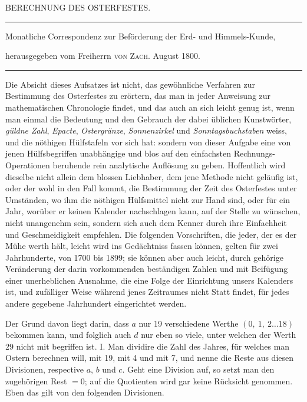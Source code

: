 \clearpage
{}
%
\begin{center}
{\large BERECHNUNG DES OSTERFESTES.\par}
\medskip\hrule\medskip
{\small Monatliche Correspondenz zur Beförderung der Erd- und Himmels-Kunde,\par
herausgegeben vom Freiherrn \textsc{von Zach}. August 1800.\par}
\medskip\hrule
\end{center}
\medskip
Die Absicht dieses Aufsatzes ist nicht, das gewöhnliche Verfahren zur Bestimmung
des Osterfestes zu erörtern, das man in jeder Anweisung zur mathematischen
Chronologie findet, und das auch an sich leicht genug ist, wenn man
einmal die Bedeutung und den Gebrauch der dabei üblichen Kunstwörter, \textit{güldne
Zahl}, \textit{Epacte}, \textit{Ostergränze}, \textit{Sonnenzirkel} und \textit{Sonntagsbuchstaben} weiss, und die
nöthigen Hülfstafeln vor sich hat: sondern von dieser Aufgabe eine von jenen
Hülfsbegriffen unabhängige und blos auf den einfachsten Rechnungs-Operationen
beruhende rein analytische Auflösung zu geben. Hoffentlich wird dieselbe
nicht allein dem blossen Liebhaber, dem jene Methode nicht geläufig ist, oder
der wohl in den Fall kommt, die Bestimmung der Zeit des Osterfestes unter Umständen,
wo ihm die nöthigen Hülfsmittel nicht zur Hand sind, oder für ein Jahr,
worüber er keinen Kalender nachschlagen kann, auf der Stelle zu wünschen,
nicht unangenehm sein, sondern sich auch dem Kenner durch ihre Einfachheit
und Geschmeidigkeit empfehlen. Die folgenden Vorschriften, die jeder, der es
der Mühe werth hält, leicht wird ins Gedächtniss fassen können, gelten für zwei
Jahrhunderte, von 1700 bis 1899; sie können aber auch leicht, durch gehörige
Veränderung der darin vorkommenden beständigen Zahlen und mit Beifügung
einer unerheblichen Ausnahme, die eine Folge der Einrichtung unsers Kalenders
ist, und zufälliger Weise während jenes Zeitraumes nicht Statt findet, für jedes
andere gegebene Jahrhundert eingerichtet werden.

%
\expandafter\def\csname HistoricalNoteText2\endcsname{Der Grund davon liegt darin, dass $a$ nur 19 verschiedene Werthe $(0,\ 1,\ 2\ldots18)$ bekommen
kann, und folglich auch $d$ nur eben so viele, unter welchen der Werth 29 nicht mit begriffen ist.}
I. Man dividire die Zahl des Jahres, für welches man Ostern berechnen
will, mit 19, mit 4 und mit 7, und nenne die Reste aus diesen Divisionen, respective
$a$, $b$ und $c$. Geht eine Division auf, so setzt man den zugehörigen Rest
$=0$; auf die Quotienten wird gar keine Rücksicht genommen. Eben das gilt
von den folgenden Divisionen.

